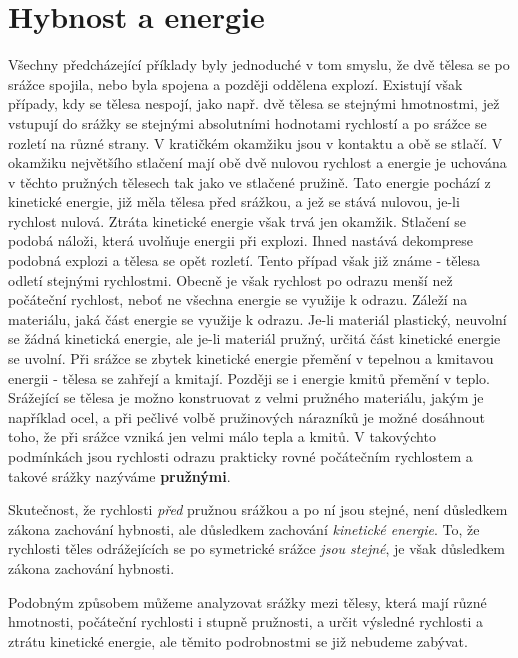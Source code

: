   \section{Hybnost a energie}
    Všechny předcházející příklady byly jednoduché v tom smyslu, že dvě tělesa se po srážce 
    spojila, nebo byla spojena a později oddělena explozí. Existují však případy, kdy se tělesa 
    nespojí, jako např. dvě tělesa se stejnými hmotnostmi, jež vstupují do srážky se stejnými 
    absolutními hodnotami rychlostí a po srážce se rozletí na různé strany. V kratičkém okamžiku 
    jsou v kontaktu a obě se stlačí. V okamžiku největšího stlačení mají obě dvě nulovou rychlost a 
    energie je uchována v těchto pružných tělesech tak jako ve stlačené pružině. Tato energie 
    pochází z kinetické energie, již měla tělesa před srážkou, a jež se stává nulovou, je-li 
    rychlost nulová. Ztráta kinetické energie však trvá jen okamžik. Stlačení se podobá náloži, 
    která uvolňuje energii při explozi. Ihned nastává dekomprese podobná explozi a tělesa se 
    opět rozletí. Tento případ však již známe - tělesa odletí stejnými rychlostmi. Obecně je však 
    rychlost po  odrazu menší než počáteční rychlost, neboť ne všechna energie se využije k odrazu. 
    Záleží na materiálu, jaká část energie se využije k odrazu. Je-li materiál plastický, neuvolní 
    se žádná kinetická energie, ale je-li materiál pružný, určitá část kinetické energie se uvolní. 
    Při srážce se zbytek kinetické energie přemění v tepelnou a kmitavou energii - tělesa se 
    zahřejí a kmitají. Později se i energie kmitů přemění v teplo. Srážející se tělesa je možno 
    konstruovat z velmi pružného materiálu, jakým je například ocel, a při pečlivé volbě 
    pružinových nárazníků je možné dosáhnout toho, že při srážce vzniká jen velmi málo tepla a 
    kmitů. V takovýchto podmínkách jsou rychlosti odrazu prakticky rovné počátečním rychlostem a 
    takové srážky nazýváme \textbf{pružnými}.
    
    Skutečnost, že rychlosti \emph{před} pružnou srážkou a po ní jsou stejné, není důsledkem zákona 
    zachování hybnosti, ale důsledkem zachování \emph{kinetické energie}. To, že rychlosti těles 
    odrážejících se po symetrické srážce \emph{jsou stejné}, je však důsledkem zákona zachování 
    hybnosti.
    
    Podobným způsobem můžeme analyzovat srážky mezi tělesy, která mají různé hmotnosti, počáteční 
    rychlosti i stupně pružnosti, a určit výsledné rychlosti a ztrátu kinetické energie, ale těmito 
    podrobnostmi se již nebudeme zabývat.
    
